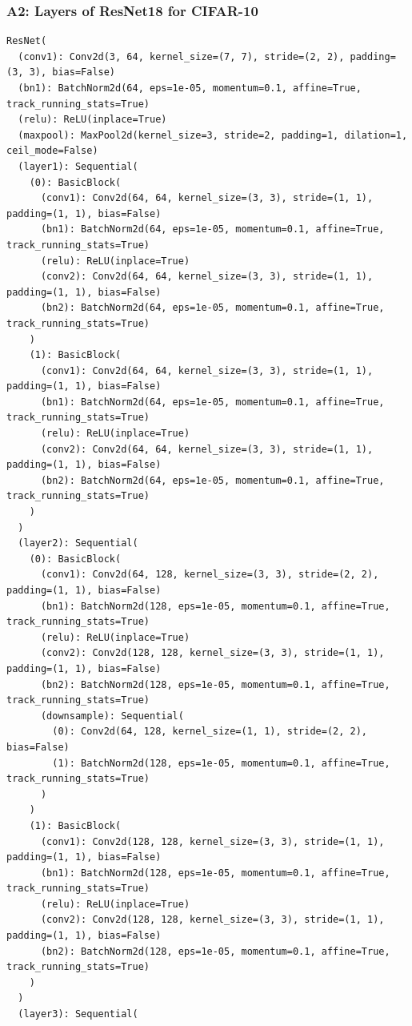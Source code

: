 \documentclass{article}
\begin{document}
\subsubsection{A2: Layers of ResNet18 for CIFAR-10}
\label{sec:A2}
\begin{verbatim}
ResNet(
  (conv1): Conv2d(3, 64, kernel_size=(7, 7), stride=(2, 2), padding=(3, 3), bias=False)
  (bn1): BatchNorm2d(64, eps=1e-05, momentum=0.1, affine=True, track_running_stats=True)
  (relu): ReLU(inplace=True)
  (maxpool): MaxPool2d(kernel_size=3, stride=2, padding=1, dilation=1, ceil_mode=False)
  (layer1): Sequential(
    (0): BasicBlock(
      (conv1): Conv2d(64, 64, kernel_size=(3, 3), stride=(1, 1), padding=(1, 1), bias=False)
      (bn1): BatchNorm2d(64, eps=1e-05, momentum=0.1, affine=True, track_running_stats=True)
      (relu): ReLU(inplace=True)
      (conv2): Conv2d(64, 64, kernel_size=(3, 3), stride=(1, 1), padding=(1, 1), bias=False)
      (bn2): BatchNorm2d(64, eps=1e-05, momentum=0.1, affine=True, track_running_stats=True)
    )
    (1): BasicBlock(
      (conv1): Conv2d(64, 64, kernel_size=(3, 3), stride=(1, 1), padding=(1, 1), bias=False)
      (bn1): BatchNorm2d(64, eps=1e-05, momentum=0.1, affine=True, track_running_stats=True)
      (relu): ReLU(inplace=True)
      (conv2): Conv2d(64, 64, kernel_size=(3, 3), stride=(1, 1), padding=(1, 1), bias=False)
      (bn2): BatchNorm2d(64, eps=1e-05, momentum=0.1, affine=True, track_running_stats=True)
    )
  )
  (layer2): Sequential(
    (0): BasicBlock(
      (conv1): Conv2d(64, 128, kernel_size=(3, 3), stride=(2, 2), padding=(1, 1), bias=False)
      (bn1): BatchNorm2d(128, eps=1e-05, momentum=0.1, affine=True, track_running_stats=True)
      (relu): ReLU(inplace=True)
      (conv2): Conv2d(128, 128, kernel_size=(3, 3), stride=(1, 1), padding=(1, 1), bias=False)
      (bn2): BatchNorm2d(128, eps=1e-05, momentum=0.1, affine=True, track_running_stats=True)
      (downsample): Sequential(
        (0): Conv2d(64, 128, kernel_size=(1, 1), stride=(2, 2), bias=False)
        (1): BatchNorm2d(128, eps=1e-05, momentum=0.1, affine=True, track_running_stats=True)
      )
    )
    (1): BasicBlock(
      (conv1): Conv2d(128, 128, kernel_size=(3, 3), stride=(1, 1), padding=(1, 1), bias=False)
      (bn1): BatchNorm2d(128, eps=1e-05, momentum=0.1, affine=True, track_running_stats=True)
      (relu): ReLU(inplace=True)
      (conv2): Conv2d(128, 128, kernel_size=(3, 3), stride=(1, 1), padding=(1, 1), bias=False)
      (bn2): BatchNorm2d(128, eps=1e-05, momentum=0.1, affine=True, track_running_stats=True)
    )
  )
  (layer3): Sequential(

\end{verbatim}
\end{document}

